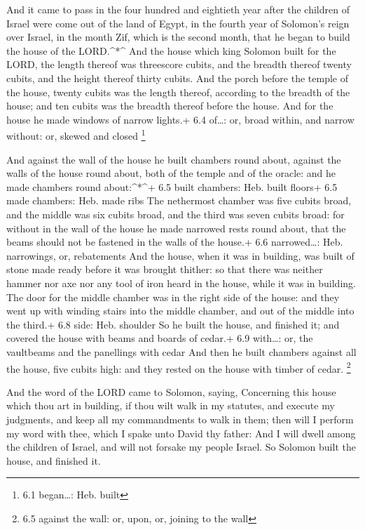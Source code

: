  And it came to pass in the four hundred and eightieth year
after the children of Israel were come out of the land of Egypt, in the
fourth year of Solomon's reign over Israel, in the month Zif, which is
the second month, that he began to build the house of the LORD.\^{}*\^{}
 And the house which king Solomon built for the LORD, the
length thereof was threescore cubits, and the breadth thereof twenty
cubits, and the height thereof thirty cubits.  And the porch
before the temple of the house, twenty cubits was the length thereof,
according to the breadth of the house; and ten cubits was the breadth
thereof before the house.  And for the house he made windows
of narrow lights.+ 6.4 of\ldots: or, broad within, and narrow without:
or, skewed and closed \footnote{6.1 began\ldots: Heb. built}

 And against the wall of the house he built chambers round
about, against the walls of the house round about, both of the temple
and of the oracle: and he made chambers round about:\^{}*\^{}+ 6.5 built
chambers: Heb. built floors+ 6.5 made chambers: Heb. made ribs
 The nethermost chamber was five cubits broad, and the
middle was six cubits broad, and the third was seven cubits broad: for
without in the wall of the house he made narrowed rests round about,
that the beams should not be fastened in the walls of the house.+ 6.6
narrowed\ldots: Heb. narrowings, or, rebatements  And the
house, when it was in building, was built of stone made ready before it
was brought thither: so that there was neither hammer nor axe nor any
tool of iron heard in the house, while it was in building. 
The door for the middle chamber was in the right side of the house: and
they went up with winding stairs into the middle chamber, and out of the
middle into the third.+ 6.8 side: Heb. shoulder  So he built
the house, and finished it; and covered the house with beams and boards
of cedar.+ 6.9 with\ldots: or, the vaultbeams and the panellings with
cedar  And then he built chambers against all the house,
five cubits high: and they rested on the house with timber of cedar.
\footnote{6.5 against the wall: or, upon, or, joining to the wall}

 And the word of the LORD came to Solomon, saying,
 Concerning this house which thou art in building, if thou
wilt walk in my statutes, and execute my judgments, and keep all my
commandments to walk in them; then will I perform my word with thee,
which I spake unto David thy father:  And I will dwell
among the children of Israel, and will not forsake my people Israel.
 So Solomon built the house, and finished it.

